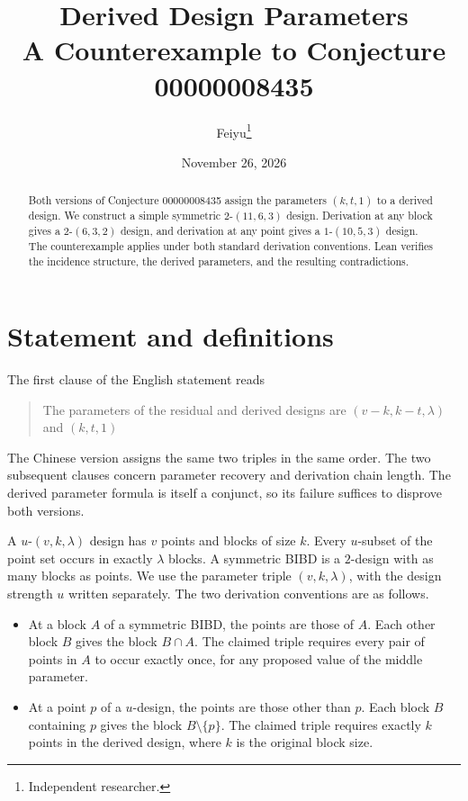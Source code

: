 \documentclass[11pt]{article}
\title{Derived Design Parameters\\A Counterexample to Conjecture 00000008435}
\author{Feiyu\thanks{Independent researcher.}}
\date{November 26, 2026}
\begin{document}
\maketitle

\begin{abstract}
Both versions of Conjecture 00000008435 assign the parameters $(k,t,1)$
to a derived design. We construct a simple symmetric $2$-$(11,6,3)$
design. Derivation at any block gives a $2$-$(6,3,2)$ design, and
derivation at any point gives a $1$-$(10,5,3)$ design. The counterexample
applies under both standard derivation conventions. Lean verifies the
incidence structure, the derived parameters, and the resulting
contradictions.
\end{abstract}

\section{Statement and definitions}

The first clause of the English statement reads \cite{conjecture}
\begin{quote}
The parameters of the residual and derived designs are
$(v-k,k-t,\lambda)$ and $(k,t,1)$
\end{quote}
The Chinese version assigns the same two triples in the same order.
The two subsequent clauses concern parameter recovery and derivation
chain length. The derived parameter formula is itself a conjunct, so
its failure suffices to disprove both versions.

A $u$-$(v,k,\lambda)$ design has $v$ points and blocks of size $k$.
Every $u$-subset of the point set occurs in exactly $\lambda$ blocks.
A symmetric BIBD is a $2$-design with as many blocks as points. We use
the parameter triple $(v,k,\lambda)$, with the design strength $u$
written separately. The two derivation conventions are as follows.

\begin{itemize}
\item At a block $A$ of a symmetric BIBD, the points are those of $A$.
  Each other block $B$ gives the block $B\cap A$. The claimed triple
  requires every pair of points in $A$ to occur exactly once, for any
  proposed value of the middle parameter. \cite{block}
\item At a point $p$ of a $u$-design, the points are those other than
  $p$. Each block $B$ containing $p$ gives the block
  $B\setminus\{p\}$. The claimed triple requires exactly $k$ points
  in the derived design, where $k$ is the original block size.
  \cite[pp.~7--8]{point}
\end{itemize}
\end{document}
